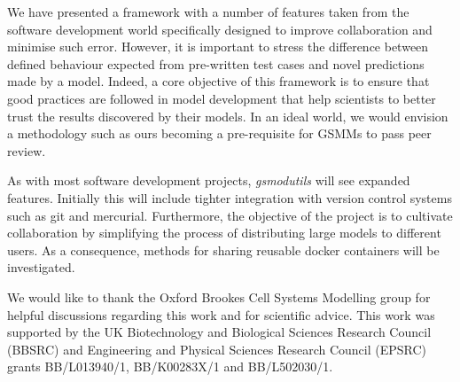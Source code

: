 \documentclass[journal=asbcd6]{achemso}
\begin{document}
We have presented a framework with a number of features taken from the software development world specifically designed to improve collaboration and minimise such error.
However, it is important to stress the difference between defined behaviour expected from pre-written test cases and novel predictions made by a model.
Indeed, a core objective of this framework is to ensure that good practices are followed in model development that help scientists to better trust the results discovered by their models.
In an ideal world, we would envision a methodology such as ours becoming a pre-requisite for GSMMs to pass peer review.

As with most software development projects, \textit{gsmodutils} will see expanded features.
Initially this will include tighter integration with version control systems such as git and mercurial.
Furthermore, the objective of the project is to cultivate collaboration by simplifying the process of distributing large models to different users.
As a consequence, methods for sharing reusable docker containers will be investigated.


\begin{acknowledgement}
We would like to thank the Oxford Brookes Cell Systems Modelling group for helpful discussions regarding this work and for scientific advice.
This work was supported by the UK Biotechnology and Biological Sciences Research Council (BBSRC) and Engineering and Physical Sciences Research Council (EPSRC) grants BB/L013940/1,  BB/K00283X/1 and BB/L502030/1.
\end{acknowledgement}


\end{document}
